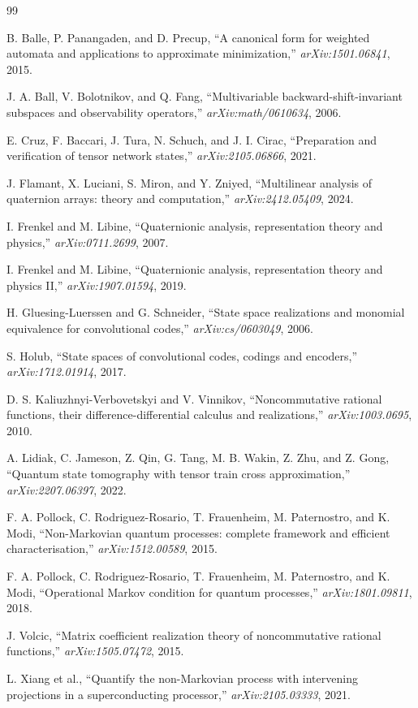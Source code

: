 \documentclass[11pt]{article}
\theoremstyle{definition}
\theoremstyle{remark}
\begin{document}
\begin{thebibliography}{99}

B. Balle, P. Panangaden, and D. Precup,
``A canonical form for weighted automata and applications to approximate minimization,''
\emph{arXiv:1501.06841}, 2015.

J. A. Ball, V. Bolotnikov, and Q. Fang,
``Multivariable backward-shift-invariant subspaces and observability operators,''
\emph{arXiv:math/0610634}, 2006.

E. Cruz, F. Baccari, J. Tura, N. Schuch, and J. I. Cirac,
``Preparation and verification of tensor network states,''
\emph{arXiv:2105.06866}, 2021.

J. Flamant, X. Luciani, S. Miron, and Y. Zniyed,
``Multilinear analysis of quaternion arrays: theory and computation,''
\emph{arXiv:2412.05409}, 2024.

I. Frenkel and M. Libine,
``Quaternionic analysis, representation theory and physics,''
\emph{arXiv:0711.2699}, 2007.

I. Frenkel and M. Libine,
``Quaternionic analysis, representation theory and physics II,''
\emph{arXiv:1907.01594}, 2019.

H. Gluesing-Luerssen and G. Schneider,
``State space realizations and monomial equivalence for convolutional codes,''
\emph{arXiv:cs/0603049}, 2006.

S. Holub,
``State spaces of convolutional codes, codings and encoders,''
\emph{arXiv:1712.01914}, 2017.

D. S. Kaliuzhnyi-Verbovetskyi and V. Vinnikov,
``Noncommutative rational functions, their difference-differential calculus and realizations,''
\emph{arXiv:1003.0695}, 2010.

A. Lidiak, C. Jameson, Z. Qin, G. Tang, M. B. Wakin, Z. Zhu, and Z. Gong,
``Quantum state tomography with tensor train cross approximation,''
\emph{arXiv:2207.06397}, 2022.

F. A. Pollock, C. Rodriguez-Rosario, T. Frauenheim, M. Paternostro, and K. Modi,
``Non-Markovian quantum processes: complete framework and efficient characterisation,''
\emph{arXiv:1512.00589}, 2015.

F. A. Pollock, C. Rodriguez-Rosario, T. Frauenheim, M. Paternostro, and K. Modi,
``Operational Markov condition for quantum processes,''
\emph{arXiv:1801.09811}, 2018.

J. Volcic,
``Matrix coefficient realization theory of noncommutative rational functions,''
\emph{arXiv:1505.07472}, 2015.

L. Xiang et al.,
``Quantify the non-Markovian process with intervening projections in a superconducting processor,''
\emph{arXiv:2105.03333}, 2021.

\end{thebibliography}
\end{document}
